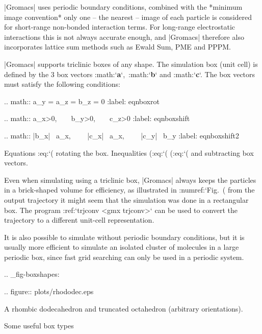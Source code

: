 |Gromacs| uses periodic boundary conditions, combined with the *minimum
image convention*
only one
– the nearest – image of each particle is considered for short-range
non-bonded interaction terms. For long-range electrostatic interactions
this is not always accurate enough, and |Gromacs| therefore also
incorporates lattice sum methods such as Ewald Sum, PME and PPPM.

|Gromacs| supports triclinic boxes of any shape. The simulation box (unit
cell) is defined by the 3 box vectors :math:`{\bf a}`,\ :math:`{\bf b}`
and :math:`{\bf c}`. The box vectors must satisfy the following
conditions:

.. math:: a_y = a_z = b_z = 0
          :label: eqnboxrot

.. math:: a_x>0,~~~~b_y>0,~~~~c_z>0
          :label: eqnboxshift

.. math:: |b_x| \leq {} \, a_x,~~~~
          |c_x| \leq {} \, a_x,~~~~
          |c_y| \leq {} \, b_y
          :label: eqnboxshift2

Equations :eq:`(%
rotating the box. Inequalities (:eq:`(%
(:eq:`(%
and subtracting box vectors.

Even when simulating using a triclinic box, |Gromacs| always keeps the
particles in a brick-shaped volume for efficiency, as illustrated in
:numref:`Fig. (%
from the output trajectory it might seem that the simulation was done in
a rectangular box. The program :ref:`trjconv <gmx trjconv>` can be used to
convert the trajectory to a different unit-cell representation.

It is also possible to simulate without periodic boundary conditions,
but it is usually more efficient to simulate an isolated cluster of
molecules in a large periodic box, since fast grid searching can only be
used in a periodic system.

.. _fig-boxshapes:

.. figure:: plots/rhododec.eps

     A rhombic dodecahedron and truncated octahedron (arbitrary
     orientations).

Some useful box types
~~~~~~~~~~~~~~~~~~~~~

